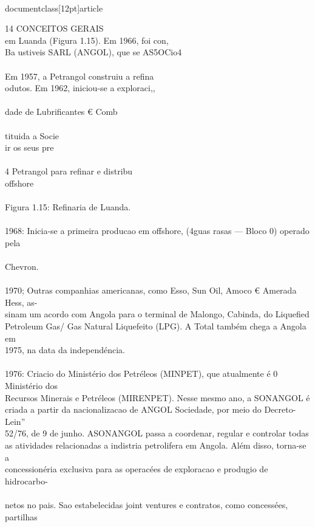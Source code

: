 \\documentclass[12pt]{article}
\begin{document}
{14 CONCEITOS GERAIS\\
em Luanda (Figura 1.15). Em 1966, foi con,\\
Ba ustiveis SARL (ANGOL), que se AS5OCio4\\
\\
Em 1957, a Petrangol construiu a refina\\
odutos. Em 1962, iniciou-se a exploraci,,\\
\\
dade de Lubrificantes € Comb\\
\\
tituida a Socie\\
ir os seus pre\\
\\
4 Petrangol para refinar e distribu\\
offshore\\
\\
Figura 1.15: Refinaria de Luanda.\\
\\
1968: Inicia-se a primeira producao em offshore, (4guas rasas — Bloco 0) operado pela\\
\\
Chevron.\\
\\
1970; Outras companhias americanas, como Esso, Sun Oil, Amoco € Amerada Hess, as-\\
sinam um acordo com Angola para o terminal de Malongo, Cabinda, do Liquefied\\
Petroleum Gas/ Gas Natural Liquefeito (LPG). A Total também chega a Angola em\\
1975, na data da independéncia.\\
\\
1976: Criacio do Ministério dos Petréleos (MINPET), que atualmente é 0 Ministério dos\\
Recursos Minerais e Petréleos (MIRENPET). Nesse mesmo ano, a SONANGOL é\\
criada a partir da nacionalizacao de ANGOL Sociedade, por meio do Decreto-Lein”\\
52/76, de 9 de junho. ASONANGOL passa a coordenar, regular e controlar todas\\
as atividades relacionadas a indistria petrolifera em Angola. Além disso, torna-se a\\
concessionéria exclusiva para as operacées de exploracao e produgio de hidrocarbo-\\
\\
netos no pais. Sao estabelecidas joint ventures e contratos, como concessées, partilhas\\
}
\end{document}
